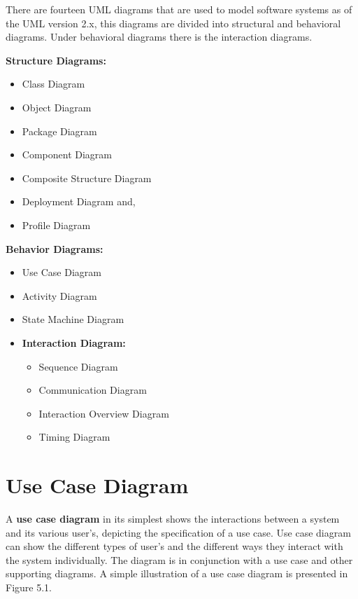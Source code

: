There are fourteen UML diagrams that are used to model software systems as of the UML version 2.x, this diagrams are divided into structural and behavioral diagrams. Under behavioral diagrams there is the interaction diagrams.

{\bf Structure Diagrams:}
\begin{itemize}
\item{Class Diagram}
\item{Object Diagram}
\item{Package Diagram}
\item{Component Diagram}
\item{Composite Structure Diagram}
\item{Deployment Diagram} and, 
\item{Profile Diagram}
\end{itemize}

{\bf Behavior Diagrams:}
\begin{itemize}
\item{Use Case Diagram}
\item{Activity Diagram}
\item{State Machine Diagram}
\item{\bf Interaction Diagram:}
\begin{itemize}
\item{Sequence Diagram}
\item{Communication Diagram}
\item{Interaction Overview Diagram}
\item{Timing Diagram}
\end{itemize}
\end{itemize}

\section{Use Case Diagram}
A {\bf use case diagram} in its simplest shows the interactions between a system and its various user's, depicting the specification of a use case. Use case diagram can show the different types of user's and the different ways they interact with the system individually. The diagram is in conjunction with a use case and other supporting diagrams. A simple illustration of a use case diagram is presented in Figure 5.1.

